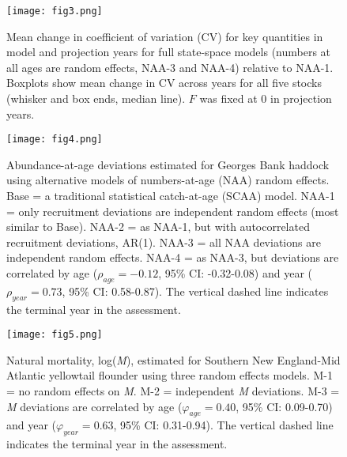 \documentclass[]{article}
\begin{document}
\pagebreak

\begin{figure}

{\centering \texttt{[image: fig3.png]}

}

\caption{Mean change in coefficient of variation (CV) for key quantities in model and projection years for full state-space models (numbers at all ages are random effects, NAA-3 and NAA-4) relative to NAA-1. Boxplots show mean change in CV across years for all five stocks (whisker and box ends, median line). $F$ was fixed at 0 in projection years.}\label{fig:cv}
\end{figure}

\pagebreak

\begin{figure}

{\centering \texttt{[image: fig4.png]}

}

\caption{Abundance-at-age deviations estimated for Georges Bank haddock using alternative models of numbers-at-age (NAA) random effects. Base = a traditional statistical catch-at-age (SCAA) model. NAA-1 = only recruitment deviations are independent random effects (most similar to Base). NAA-2 = as NAA-1, but with autocorrelated recruitment deviations, AR(1). NAA-3 = all NAA deviations are independent random effects. NAA-4 = as NAA-3, but deviations are correlated by age ($\rho_{age} = -0.12$, 95\% CI: -0.32-0.08) and year ($\rho_{year} = 0.73$, 95\% CI: 0.58-0.87). The vertical dashed line indicates the terminal year in the assessment.}\label{fig:devs-GBhaddock-naa}
\end{figure}

\pagebreak

\begin{figure}

{\centering \texttt{[image: fig5.png]}

}

\caption{Natural mortality, log(\textit{M}), estimated for Southern New England-Mid Atlantic yellowtail flounder using three random effects models. M-1 = no random effects on \textit{M}. M-2 = independent \textit{M} deviations. M-3 = \textit{M} deviations are correlated by age ($\varphi_{age} = 0.40$, 95\% CI: 0.09-0.70) and year ($\varphi_{year} = 0.63$, 95\% CI: 0.31-0.94). The vertical dashed line indicates the terminal year in the assessment.}\label{fig:devs-snemayt-m}
\end{figure}
\end{document}
